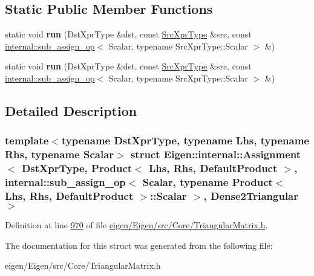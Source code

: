 \subsection*{Static Public Member Functions}
\begin{DoxyCompactItemize}
\item 
\mbox{\label{struct_eigen_1_1internal_1_1_assignment_3_01_dst_xpr_type_00_01_product_3_01_lhs_00_01_rhs_00_01bb8efed27d47832b53496ca7f6c9254b_a0e60cd1a3ddaf3a1c3b159c0c70c0662}} 
static void {\bfseries run} (Dst\+Xpr\+Type \&dst, const \hyperlink{group___core___module_class_eigen_1_1_product}{Src\+Xpr\+Type} \&src, const \hyperlink{struct_eigen_1_1internal_1_1sub__assign__op}{internal\+::sub\+\_\+assign\+\_\+op}$<$ Scalar, typename Src\+Xpr\+Type\+::\+Scalar $>$ \&)
\item 
\mbox{\label{struct_eigen_1_1internal_1_1_assignment_3_01_dst_xpr_type_00_01_product_3_01_lhs_00_01_rhs_00_01bb8efed27d47832b53496ca7f6c9254b_a0e60cd1a3ddaf3a1c3b159c0c70c0662}} 
static void {\bfseries run} (Dst\+Xpr\+Type \&dst, const \hyperlink{group___core___module_class_eigen_1_1_product}{Src\+Xpr\+Type} \&src, const \hyperlink{struct_eigen_1_1internal_1_1sub__assign__op}{internal\+::sub\+\_\+assign\+\_\+op}$<$ Scalar, typename Src\+Xpr\+Type\+::\+Scalar $>$ \&)
\end{DoxyCompactItemize}


\subsection{Detailed Description}
\subsubsection*{template$<$typename Dst\+Xpr\+Type, typename Lhs, typename Rhs, typename Scalar$>$\newline
struct Eigen\+::internal\+::\+Assignment$<$ Dst\+Xpr\+Type, Product$<$ Lhs, Rhs, Default\+Product $>$, internal\+::sub\+\_\+assign\+\_\+op$<$ Scalar, typename Product$<$ Lhs, Rhs, Default\+Product $>$\+::\+Scalar $>$, Dense2\+Triangular $>$}



Definition at line \hyperlink{eigen_2_eigen_2src_2_core_2_triangular_matrix_8h_source_l00970}{970} of file \hyperlink{eigen_2_eigen_2src_2_core_2_triangular_matrix_8h_source}{eigen/\+Eigen/src/\+Core/\+Triangular\+Matrix.\+h}.



The documentation for this struct was generated from the following file\+:\begin{DoxyCompactItemize}
\item 
eigen/\+Eigen/src/\+Core/\+Triangular\+Matrix.\+h\end{DoxyCompactItemize}
